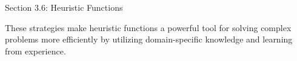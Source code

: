 \begin{notes}{Section 3.6: Heuristic Functions}
\begin{highlight}
    These strategies make heuristic functions a powerful tool for solving complex problems more efficiently by utilizing domain-specific knowledge and learning from experience.
    
    \end{highlight}
\end{notes}